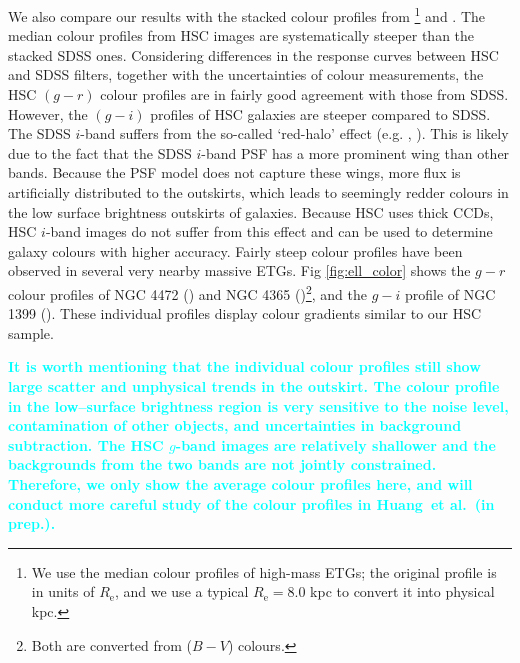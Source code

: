 \documentclass[fleqn,usenatbib]{mnras}
\def\etal{{\ et al.~}}
\newcommand{\song}[1]{\textcolor{cyan}{\textbf{#1}}}
\begin{document}
    We also compare our results with the stacked colour profiles from  
    \citealt{LaBarbera2010}\footnote{We use the median colour profiles of high-mass 
    ETGs; the original profile is in units of $R_{\mathrm{e}}$, and we use a typical 
    $R_{\mathrm{e}}=8.0$ kpc to convert it into physical kpc.} and 
    \citealt{DSouza2014}.
    The median colour profiles from HSC images are systematically steeper than the 
    stacked SDSS ones. 
    Considering differences in the response curves between HSC and SDSS filters, 
    together with the uncertainties of colour measurements, the HSC $(g-r)$ colour 
    profiles are in fairly good agreement with those from SDSS. 
    However, the $(g-i)$ profiles of HSC galaxies are steeper compared to SDSS. 
    The SDSS $i$-band suffers from the so-called `red-halo' effect
    (e.g. \citealt{Wu2005}, \citealt{Tal2011}).  
    This is likely due to the fact that the SDSS $i$-band PSF has a more prominent 
    wing than other bands. 
    Because the PSF model does not capture these wings, more flux is artificially 
    distributed to the outskirts, which leads to seemingly redder colours in the low 
    surface brightness outskirts of galaxies. 
    Because HSC uses thick CCDs, HSC $i$-band images do not suffer from this effect 
    and can be used to determine galaxy colours with higher accuracy. 
    Fairly steep colour profiles have been observed in several very nearby massive 
    ETGs.  
    Fig \ref{fig:ell_color} shows the $g-r$ colour profiles of NGC 4472 
    (\citealt{Mihos2013}) and NGC 4365 (\citealt{Mihos2017})\footnote{
    Both are converted from ($B-V$) colours.}, and the $g-i$ profile of NGC 1399 
    (\citealt{Iodice2016}). 
    These individual profiles display colour gradients similar to our HSC sample.  
   
    \song{
    It is worth mentioning that the individual colour profiles still show large 
    scatter and unphysical trends in the outskirt.  
    The colour profile in the low--surface brightness region is very sensitive to 
    the noise level, contamination of other objects, and uncertainties in background 
    subtraction. 
    The HSC $g$-band images are relatively shallower and the backgrounds from the
    two bands are not jointly constrained. 
    Therefore, we only show the average colour profiles here, and will conduct 
    more careful study of the colour profiles in Huang\etal (in prep.).
    } 
    
    
\end{document}
